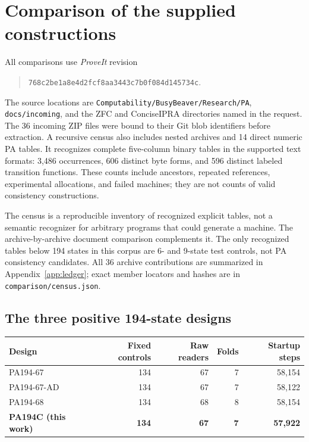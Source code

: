 \documentclass[11pt,letterpaper]{article}
\newcommand{\file}[1]{\texttt{\nolinkurl{#1}}}
\begin{document}
\section{Comparison of the supplied constructions}
\label{sec:comparison}

All comparisons use \emph{ProveIt} revision
\begin{quote}\small
\nolinkurl{768c2be1a8e4d2fcf8aa3443c7b0f084d145734c}.
\end{quote}
The source locations are \file{Computability/BusyBeaver/Research/PA},
\file{docs/incoming}, and the ZFC and ConciseIPRA directories named in the
request. The 36 incoming ZIP files were bound to their Git blob identifiers
before extraction. A recursive census also includes nested archives and
14 direct numeric PA tables. It recognizes complete five-column binary
tables in the supported text formats: 3,486 occurrences, 606 distinct byte
forms, and 596 distinct labeled transition functions. These counts include
ancestors, repeated references, experimental allocations, and failed
machines; they are not counts of valid consistency constructions.

The census is a reproducible inventory of recognized explicit tables,
not a semantic recognizer for arbitrary programs that could generate a
machine. The archive-by-archive document comparison complements it.
The only recognized tables below 194 states in this corpus are 6- and
9-state test controls, not PA consistency candidates. All 36 archive
contributions are summarized in Appendix~\ref{app:ledger}; exact member
locators and hashes are in \file{comparison/census.json}.

\subsection{The three positive 194-state designs}

\begin{center}\small
\begin{tabular}{@{}lrrrr@{}}
\toprule
Design & Fixed controls & Raw readers & Folds & Startup steps\\
\midrule
PA194-67 &134&67&7&58,154\\
PA194-67-AD &134&67&7&58,122\\
PA194-68 &134&68&8&58,154\\
\textbf{PA194C (this work)} &\textbf{134}&\textbf{67}&\textbf{7}&\textbf{57,922}\\
\bottomrule
\end{tabular}
\end{center}
\end{document}
